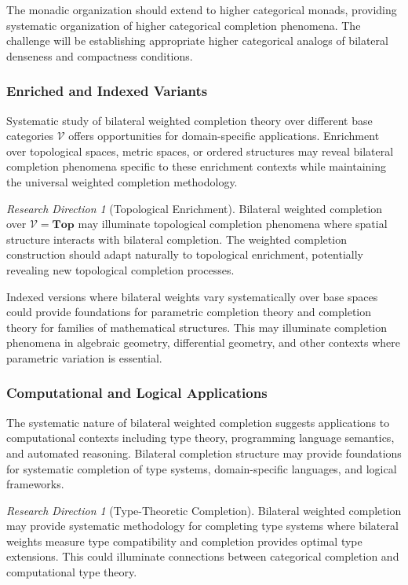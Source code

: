 \documentclass[11pt]{article}
\theoremstyle{plain}
\theoremstyle{definition}
\theoremstyle{remark}
\newtheorem{research_direction}[theorem]{Research Direction}
\newcommand{\V}{\mathcal{V}}
\begin{document}
The monadic organization should extend to higher categorical monads, providing systematic organization of higher categorical completion phenomena. The challenge will be establishing appropriate higher categorical analogs of bilateral denseness and compactness conditions.

\subsubsection{Enriched and Indexed Variants}

Systematic study of bilateral weighted completion theory over different base categories $\V$ offers opportunities for domain-specific applications. Enrichment over topological spaces, metric spaces, or ordered structures may reveal bilateral completion phenomena specific to these enrichment contexts while maintaining the universal weighted completion methodology.

\begin{research_direction}[Topological Enrichment]
Bilateral weighted completion over $\V = \mathbf{Top}$ may illuminate topological completion phenomena where spatial structure interacts with bilateral completion. The weighted completion construction should adapt naturally to topological enrichment, potentially revealing new topological completion processes.
\end{research_direction}

Indexed versions where bilateral weights vary systematically over base spaces could provide foundations for parametric completion theory and completion theory for families of mathematical structures. This may illuminate completion phenomena in algebraic geometry, differential geometry, and other contexts where parametric variation is essential.

\subsubsection{Computational and Logical Applications}

The systematic nature of bilateral weighted completion suggests applications to computational contexts including type theory, programming language semantics, and automated reasoning. Bilateral completion structure may provide foundations for systematic completion of type systems, domain-specific languages, and logical frameworks.

\begin{research_direction}[Type-Theoretic Completion]
Bilateral weighted completion may provide systematic methodology for completing type systems where bilateral weights measure type compatibility and completion provides optimal type extensions. This could illuminate connections between categorical completion and computational type theory.
\end{research_direction}
\end{document}
